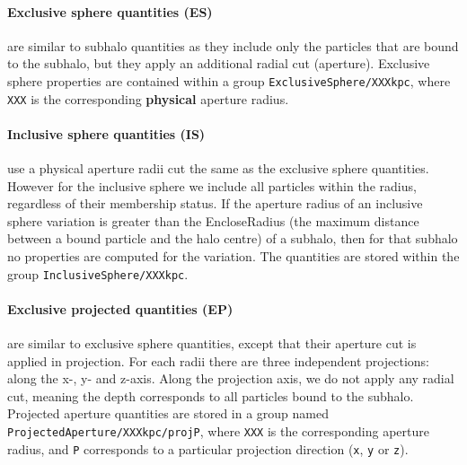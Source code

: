 \documentclass{article}
\begin{document}
\paragraph{Exclusive sphere quantities (ES)} are similar to subhalo quantities as they include only the 
particles that are bound to the subhalo, but they apply an additional radial cut (aperture). Exclusive sphere 
properties are contained within a group \verb+ExclusiveSphere/XXXkpc+, where 
\verb+XXX+ is the corresponding \textbf{physical} aperture radius.

\paragraph{Inclusive sphere quantities (IS)} use a physical aperture radii cut the same as the exclusive sphere 
quantities. However for the inclusive sphere we include all particles within the radius, regardless of their 
membership status. If the aperture radius of an inclusive sphere variation is greater than the EncloseRadius
(the maximum distance between a bound particle and the halo centre) of a subhalo, then for that subhalo no
properties are computed for the variation.
The quantities are stored within the group \verb+InclusiveSphere/XXXkpc+. 

\paragraph{Exclusive projected quantities (EP)} are similar to exclusive sphere quantities, except that their 
aperture cut is applied in projection. For each radii there are three  independent projections: along the 
x-, y- and z-axis. Along the projection axis, we do not apply any radial cut, meaning the depth corresponds to all particles 
bound to the subhalo. Projected aperture quantities are stored in a group named 
\verb+ProjectedAperture/XXXkpc/projP+, where \verb+XXX+ is the corresponding aperture radius, and \verb+P+ 
corresponds to a particular projection direction (\verb+x+, \verb+y+ or \verb+z+).
\end{document}
